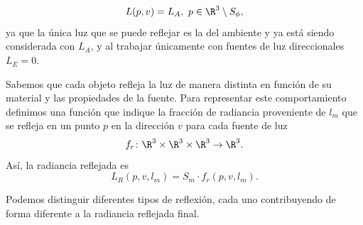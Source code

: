 \begin{equation*}
    L(p,v) = L_A,\ p\in \R^3\setminus S_{\phi},
\end{equation*}
ya que la única luz que se puede reflejar es la del ambiente y ya está siendo considerada con $L_A$, y al trabajar únicamente con fuentes de luz direccionales $L_E=0$. \newline

Sabemos que cada objeto refleja la luz de manera distinta en función de su material y las propiedades de la fuente. Para representar este comportamiento definimos una función que indique la fracción de radiancia proveniente de $l_m$ que se refleja en un punto $p$ en la dirección $v$ para cada fuente de luz
\begin{equation*}
    f_r \colon \R^3\times \R^3\times \R^3 \to \R^3.
\end{equation*}
Así, la radiancia reflejada es
\begin{equation*}
    L_R(p,v,l_m) = S_m\cdot f_r(p,v,l_m).
\end{equation*}

Podemos distinguir diferentes tipos de reflexión, cada uno contribuyendo de forma diferente a la radiancia reflejada final.

